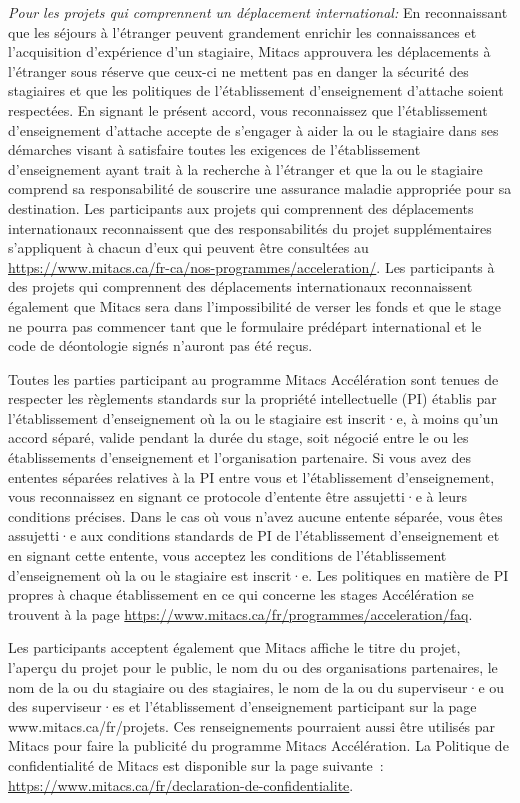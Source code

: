 {\textit{Pour les projets qui comprennent un déplacement international:} En reconnaissant que les séjours à l'étranger peuvent grandement enrichir les connaissances et l'acquisition d'expérience d'un stagiaire, Mitacs approuvera les déplacements à l'étranger sous réserve que ceux-ci ne mettent pas en danger la sécurité des stagiaires et que les politiques de l'établissement d'enseignement d'attache soient respectées. En signant le présent accord, vous reconnaissez que l'établissement d'enseignement d'attache accepte de s'engager à aider la ou le stagiaire dans ses démarches visant à satisfaire toutes les exigences de l'établissement d'enseignement ayant trait à la recherche à l'étranger et que la ou le stagiaire comprend sa responsabilité de souscrire une assurance maladie appropriée pour sa destination. Les participants aux projets qui comprennent des déplacements internationaux reconnaissent que des responsabilités du projet supplémentaires s'appliquent à chacun d'eux qui peuvent être consultées au \url{https://www.mitacs.ca/fr-ca/nos-programmes/acceleration/}. Les participants à des projets qui comprennent des déplacements internationaux reconnaissent également que Mitacs sera dans l'impossibilité de verser les fonds et que le stage ne pourra pas commencer tant que le formulaire prédépart international et le code de déontologie signés n'auront pas été reçus.

Toutes les parties participant au programme Mitacs Accélération sont tenues de respecter les règlements standards sur la propriété intellectuelle (PI) établis par l'établissement d'enseignement où la ou le stagiaire est inscrit·e, à moins qu'un accord séparé, valide pendant la durée du stage, soit négocié entre le ou les établissements d'enseignement et l'organisation partenaire. Si vous avez des ententes séparées relatives à la PI entre vous et l'établissement d'enseignement, vous reconnaissez en signant ce protocole d'entente être assujetti·e à leurs conditions précises.  Dans le cas où vous n'avez aucune entente séparée, vous êtes assujetti·e aux conditions standards de PI de l'établissement d'enseignement et en signant cette entente, vous acceptez les conditions de l'établissement d'enseignement où la ou le stagiaire est inscrit·e. Les politiques en matière de PI propres à chaque établissement en ce qui concerne les stages Accélération se trouvent à la page \url{https://www.mitacs.ca/fr/programmes/acceleration/faq}.

Les participants acceptent également que Mitacs affiche le titre du projet, l'aperçu du projet pour le public, le nom du ou des organisations partenaires, le nom de la ou du stagiaire ou des stagiaires, le nom de la ou du superviseur·e ou des superviseur·es et l'établissement d'enseignement participant sur la page www.mitacs.ca/fr/projets. Ces renseignements pourraient aussi être utilisés par Mitacs pour faire la publicité du programme Mitacs Accélération. La Politique de confidentialité de Mitacs est disponible sur la page suivante : \url{https://www.mitacs.ca/fr/declaration-de-confidentialite}.

}
